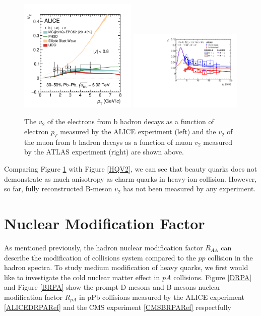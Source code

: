 \begin{figure}[hbtp]
\begin{center}
\includegraphics[width=0.50\textwidth]{Figures/Chapter2/ALICENPEv2.png}
\includegraphics[width=0.485\textwidth]{Figures/Chapter2/ATLASNPMUv2.png}
\caption{The $v_2$ of the electrons from b hadron decays as a function of electron $p_T$ measured by the ALICE experiment (left) and the $v_2$ of the muon from b hadron decays as a function of muon $v_2$ measured by the ATLAS experiment (right) are shown above.}
\label{BeautyEV2}
\end{center}
\end{figure}   


Comparing Figure \ref{BeautyEV2} with Figure \ref{HQV2}, we can see that beauty quarks does not demonstrate as much anisotropy as charm quarks in heavy-ion collision. However, so far, fully reconstructed B-meson $v_2$ has not been measured by any experiment. 




\section{Nuclear Modification Factor}

As mentioned previously, the hadron nuclear modification factor $R_{AA}$ can describe the modification of collisions system compared to the $pp$ collision in the hadron spectra. To study medium modification of heavy quarks, we first would like to investigate the cold nuclear matter effect in $pA$ collisions. Figure \ref{DRPA} and Figure \ref{BRPA} show the prompt D mesons and B mesons nuclear modification factor $R_{pA}$ in pPb collisions measured by the ALICE experiment \ref{ALICEDRPARef} and the CMS experiment \ref{CMSBRPARef} respectfully 



